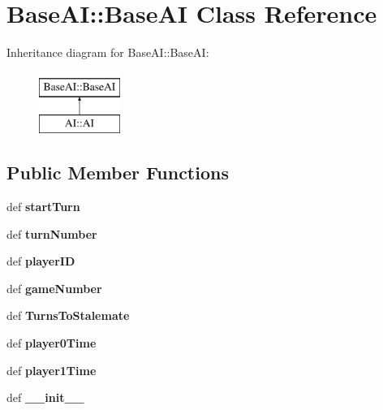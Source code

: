 \hypertarget{classBaseAI_1_1BaseAI}{
\section{BaseAI::BaseAI Class Reference}
\label{classBaseAI_1_1BaseAI}
}
Inheritance diagram for BaseAI::BaseAI:\begin{figure}[H]
\begin{center}
\leavevmode
\includegraphics[height=2.000000cm]{classBaseAI_1_1BaseAI}
\end{center}
\end{figure}
\subsection*{Public Member Functions}
\begin{DoxyCompactItemize}
\item 
\hypertarget{classBaseAI_1_1BaseAI_a2dcbc8732112a39869c75ed9f0771633}{
def {\bfseries startTurn}}
\label{classBaseAI_1_1BaseAI_a2dcbc8732112a39869c75ed9f0771633}

\item 
\hypertarget{classBaseAI_1_1BaseAI_afa3d3ad590dd453c4d064a3c16b7f1a8}{
def {\bfseries turnNumber}}
\label{classBaseAI_1_1BaseAI_afa3d3ad590dd453c4d064a3c16b7f1a8}

\item 
\hypertarget{classBaseAI_1_1BaseAI_a60e0d6b3832faae7c85b4c9f0be10196}{
def {\bfseries playerID}}
\label{classBaseAI_1_1BaseAI_a60e0d6b3832faae7c85b4c9f0be10196}

\item 
\hypertarget{classBaseAI_1_1BaseAI_a32416775fed0eb83efe7221d732cbd70}{
def {\bfseries gameNumber}}
\label{classBaseAI_1_1BaseAI_a32416775fed0eb83efe7221d732cbd70}

\item 
\hypertarget{classBaseAI_1_1BaseAI_ac44d94ca17f3f274d124bdfd14f14031}{
def {\bfseries TurnsToStalemate}}
\label{classBaseAI_1_1BaseAI_ac44d94ca17f3f274d124bdfd14f14031}

\item 
\hypertarget{classBaseAI_1_1BaseAI_a3bf925534912eaebc263179a9c058f17}{
def {\bfseries player0Time}}
\label{classBaseAI_1_1BaseAI_a3bf925534912eaebc263179a9c058f17}

\item 
\hypertarget{classBaseAI_1_1BaseAI_a947dcca2869c60f33dbb3b553d70a321}{
def {\bfseries player1Time}}
\label{classBaseAI_1_1BaseAI_a947dcca2869c60f33dbb3b553d70a321}

\item 
\hypertarget{classBaseAI_1_1BaseAI_a0b938d864530091b6efd420a2ed38d10}{
def {\bfseries \_\-\_\-init\_\-\_\-}}
\label{classBaseAI_1_1BaseAI_a0b938d864530091b6efd420a2ed38d10}

\end{DoxyCompactItemize}
